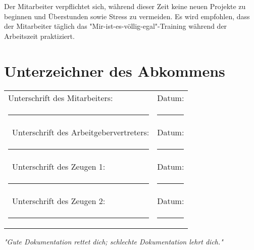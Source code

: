 \documentclass[a4paper,11pt]{article}
\begin{document}
Der Mitarbeiter verpflichtet sich, während dieser Zeit keine neuen Projekte zu beginnen und Überstunden sowie Stress zu vermeiden. Es wird empfohlen, dass der Mitarbeiter täglich das "Mir-ist-es-völlig-egal"-Training während der Arbeitszeit praktiziert.

\section*{Unterzeichner des Abkommens}

\vspace{2em}
\noindent\begin{tabular}{@{}p{8cm}p{8cm}@{}}
Unterschrift des Mitarbeiters: & Datum: \\
\rule{8cm}{0.4pt} & \rule{8cm}{0.4pt} \\\
Unterschrift des Arbeitgebervertreters: & Datum: \\
\rule{8cm}{0.4pt} & \rule{8cm}{0.4pt} \\\
Unterschrift des Zeugen 1: & Datum: \\
\rule{8cm}{0.4pt} & \rule{8cm}{0.4pt} \\\
Unterschrift des Zeugen 2: & Datum: \\
\rule{8cm}{0.4pt} & \rule{8cm}{0.4pt}
\end{tabular}

\vfill

\begin{center}
    \textit{"Gute Dokumentation rettet dich; schlechte Dokumentation lehrt dich."}
\end{center}
\end{document}
